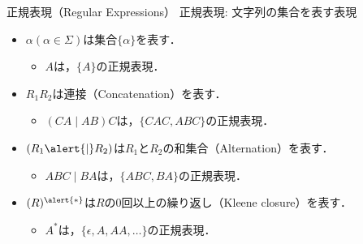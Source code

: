 \documentclass[dvipdfmx,12pt,beamer]{standalone}
\begin{document}
\begin{frame}{正規表現（Regular Expressions）} 
  \alert{正規表現}: 文字列の集合を表す表現\\
	\begin{itemize}
    \item $\alpha (\alpha \in \Sigma)$は集合$\{\alpha\}$を表す．
			\begin{itemize}
        \item $A$は，$\{A\}$の正規表現．
			\end{itemize}
		\item $R_1R_2$は連接（Concatenation）を表す．
			\begin{itemize}
				\item $(CA\mid AB)C$は，$\{CAC, ABC\}$の正規表現．
			\end{itemize}
    \item $(R_1\alert{\mid}R_2)$は$R_1$と$R_2$の和集合（Alternation）を表す．
			\begin{itemize}
				\item $ABC\mid BA$は，$\{ABC, BA\}$の正規表現．
			\end{itemize}
    \item $(R)^{\alert{*}}$は$R$の$0$回以上の繰り返し（Kleene closure）を表す．
			\begin{itemize}
				\item $A^*$は，$\{\epsilon, A, AA, \ldots\}$の正規表現．
			\end{itemize}
	\end{itemize}
\end{frame}
\end{document}
